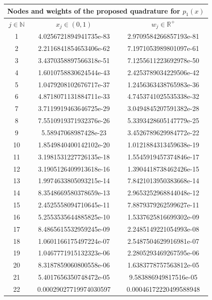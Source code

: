 \documentclass[a4paper, twosided]{book}
\begin{document}
\newpage
\vspace{0.2cm}
\begin{table}[H]
\centering
\begin{tabular}{|c||c|c|}
\hline
\multicolumn{3}{|c|}{\textbf{Nodes and weights of the proposed quadrature for $p_1(x)$ }} \\
\hline
$j\in\mathbb{N}$ & $x_j\in(0,1)$ & $w_j\in\mathbb{R}^+$ \\
\hline
1   &  4.0256721894941735e-83  &  2.9709584266857193e-81  \\
2   &  2.2116841854653406e-62  &  7.1971053989801097e-61  \\
3   &  3.4370358897566318e-51  &  7.1255611223692978e-50  \\
4   &  1.6010758830624544e-43  &  2.4253789034229506e-42  \\
5   &  1.0479208102676717e-37  &  1.2456363438765983e-36  \\
6   &  4.8718071131884711e-33  &  4.7453741025535338e-32  \\
7   &  3.7119919463646725e-29  &  3.0494845207591382e-28  \\
8   &  7.5510919371932376e-26  &  5.3393428605147779e-25  \\
9   &  5.58947068987428e-23    &  3.4526789629984772e-22  \\
10  &  1.8549840400142102e-20  &  1.0121884313459638e-19  \\
11  &  3.1981531227726135e-18  &  1.5545919457374846e-17  \\
12  &  3.1905126409913618e-16  &  1.3904418738462426e-15  \\
13  &  1.9974633805093215e-14  &  7.8421013950383668e-14  \\
14  &  8.3548669580378659e-13  &  2.9653252968844048e-12  \\
15  &  2.4525558094710645e-11  &  7.8879379262599627e-11  \\
16  &  5.2553535644885825e-10  &  1.5337625816699302e-09  \\
17  &  8.4865615532959245e-09  &  2.2485149221054993e-08  \\
18  &  1.0601166175497224e-07  &  2.5487504629916981e-07  \\
19  &  1.0467771915132323e-06  &  2.2805293469267595e-06  \\
20  &  8.3187859060800558e-06  &  1.6383778757563812e-05  \\
21  &  5.4017656350748472e-05  &  9.583886949817516e-05   \\
22  &  0.00029027719974030597  &  0.00046172220499588948  \\

\end{tabular}
\end{table}
\end{document}
